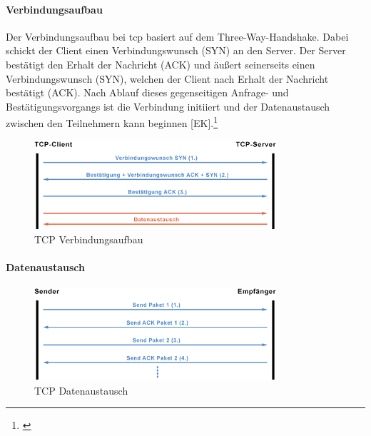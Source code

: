 \paragraph{Verbindungsaufbau}
Der Verbindungsaufbau bei \gls{tcp} basiert auf dem Three-Way-Handshake. Dabei schickt der Client einen Verbindungswunsch (SYN) an den Server. Der Server bestätigt den Erhalt der Nachricht (ACK) und äußert seinerseits einen Verbindungswunsch (SYN), welchen der Client nach Erhalt der Nachricht bestätigt (ACK). Nach Ablauf dieses gegenseitigen Anfrage- und Bestätigungsvorgangs ist die Verbindung initiiert und der Datenaustausch zwischen den Teilnehmern kann beginnen [EK].\footnote{\citep[vgl.][TCP-Kommunikation]{Schnabel.TCPKommunikation}\label{note66}}
\begin{figure}[h]
	\centering
	\includegraphics[width=0.8\textwidth]{images/Verbindungsaufbau.png}
	\caption[TCP Verbindungsaufbau]{TCP Verbindungsaufbau \cite{Schnabel.TCPKommunikation}}
	\label{fig:<Sprungmakre>}
\end{figure}
\paragraph{Datenaustausch}
\begin{figure}[h]
	\centering
	\includegraphics[width=0.8\textwidth]{images/Datenaustausch.png}
	\caption[TCP Datenaustausch]{TCP Datenaustausch \cite{Schnabel.TCPKommunikation}}
	\label{fig:<Sprungmakre>}
\end{figure}
